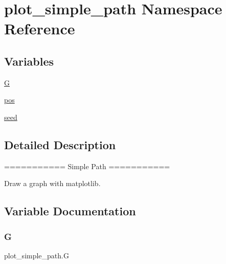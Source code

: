 \hypertarget{namespaceplot__simple__path}{}\section{plot\+\_\+simple\+\_\+path Namespace Reference}
\label{namespaceplot__simple__path}
\subsection*{Variables}
\begin{DoxyCompactItemize}
\item 
\hyperlink{namespaceplot__simple__path_a994f6cacf2d625a700f53575dbdbdc60}{G}
\item 
\hyperlink{namespaceplot__simple__path_ace45f7e46512064c1bdb241d0a2a0e65}{pos}
\item 
\hyperlink{namespaceplot__simple__path_a079eecd33549d3e3c179c9dd26b01561}{seed}
\end{DoxyCompactItemize}


\subsection{Detailed Description}
\begin{DoxyVerb}===========
Simple Path
===========

Draw a graph with matplotlib.
\end{DoxyVerb}
 

\subsection{Variable Documentation}
\mbox{\label{namespaceplot__simple__path_a994f6cacf2d625a700f53575dbdbdc60}} 
\subsubsection{\texorpdfstring{G}{G}}
{\footnotesize\ttfamily plot\+\_\+simple\+\_\+path.\+G}

\mbox{\label{namespaceplot__simple__path_ace45f7e46512064c1bdb241d0a2a0e65}} 
